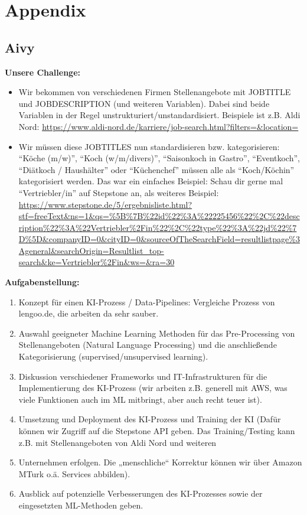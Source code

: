 \chapter{Appendix}
	\section{Aivy}
	\label{sec:aivy}
	\textbf{Unsere Challenge:}
	\begin{itemize}
		\item Wir bekommen von verschiedenen Firmen Stellenangebote mit JOBTITLE und JOBDESCRIPTION (und weiteren Variablen). Dabei sind beide Variablen in der Regel unstrukturiert/unstandardisiert. Beispiele ist z.B. Aldi Nord: \url{https://www.aldi-nord.de/karriere/job-search.html?filters=&location=}
		\item Wir müssen diese JOBTITLES nun standardisieren bzw. kategorisieren: \enquote{Köche (m/w)}, \enquote{Koch (w/m/divers)}, \enquote{Saisonkoch in Gastro}, \enquote{Eventkoch}, \enquote{Diätkoch / Haushälter} oder \enquote{Küchenchef} müssen alle als \enquote{Koch/Köchin} kategorisiert werden. Das war ein einfaches Beispiel: Schau dir gerne mal \enquote{Vertriebler/in} auf Stepstone an, als weiteres Beispiel: \url{https://www.stepstone.de/5/ergebnisliste.html?stf=freeText&ns=1&qs=%5B%7B%22id%22%3A%22225456%22%2C%22description%22%3A%22Vertriebler%2Fin%22%2C%22type%22%3A%22jd%22%7D%5D&companyID=0&cityID=0&sourceOfTheSearchField=resultlistpage%3Ageneral&searchOrigin=Resultlist_top-search&ke=Vertriebler%2Fin&ws=&ra=30}
	\end{itemize}
	\textbf{Aufgabenstellung:}
	\begin{enumerate}
		\item Konzept für einen KI-Prozess / Data-Pipelines: Vergleiche Prozess von lengoo.de, die arbeiten da sehr sauber.
		\item Auswahl geeigneter Machine Learning Methoden für das Pre-Processing von Stellenangeboten (Natural Language Processing) und die anschließende Kategorisierung (supervised/unsupervised learning).
		\item Diskussion verschiedener Frameworks und IT-Infrastrukturen für die Implementierung des KI-Prozess (wir arbeiten z.B. generell mit AWS, was viele Funktionen auch im ML mitbringt, aber auch recht teuer ist).
		\item  Umsetzung und Deployment des KI-Prozess und Training der KI (Dafür können wir Zugriff auf die Stepstone API geben. Das Training/Testing kann z.B. mit Stellenangeboten von Aldi Nord und weiteren
		\item Unternehmen erfolgen. Die „menschliche“ Korrektur können wir über Amazon MTurk o.ä. Services abbilden).
		\item Ausblick auf potenzielle Verbesserungen des KI-Prozesses sowie der eingesetzten ML-Methoden geben.
	\end{enumerate}

